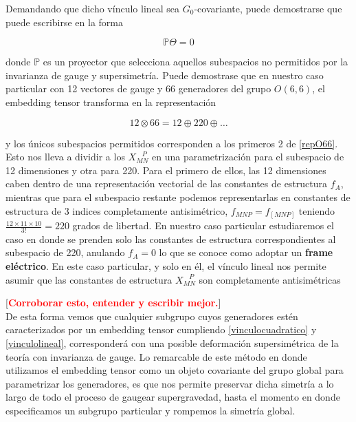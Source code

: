 \documentclass{article}
\numberwithin{equation}{section}
\begin{document}
Demandando que dicho vínculo lineal sea $G_0$-covariante, puede demostrarse que puede escribirse en la forma

\begin{equation}\label{vinculolineal}
\mathbb{P} \Theta = 0
\end{equation} 

donde $ \mathbb{P} $ es un proyector que selecciona aquellos subespacios no permitidos por la invarianza de gauge y supersimetría. Puede demostrase que en nuestro caso particular con 12 vectores de gauge y 66 generadores del grupo $ O(6,6) $, el embedding tensor transforma en la representación

\begin{equation}\label{repO66}
 12 \otimes 66 = 12 \oplus 220 \oplus \dots
\end{equation}

y los únicos subespacios permitidos corresponden a los primeros 2 de \ref{repO66}. Esto nos lleva a dividir a los $ X_{M N}^{\ \ \ \ P} $ en una parametrización para el subespacio de 12 dimensiones y otra para 220. Para el primero de ellos, las 12 dimensiones caben dentro de una representación vectorial de las constantes de estructura $ f_{A} $, mientras que para el subespacio restante podemos representarlas en constantes de estructura de 3 indices completamente antisimétrico, $ f_{M N P} = f_{\left[M N P\right]} $ teniendo $ \frac{12 \times 11 \times 10}{3!} = 220 $ grados de libertad. En nuestro caso particular estudiaremos el caso en donde se prenden solo las constantes de estructura correspondientes al subespacio de 220, anulando $ f_{A}=0 $ lo que se conoce como adoptar un \textbf{frame eléctrico}. En este caso particular, y solo en él, el vínculo lineal nos permite asumir que las constantes de estructura $ X_{M N}^{\ \ \ \ P} $ son completamente antisimétricas

[\textcolor{red}{\textbf{Corroborar esto, entender y escribir mejor.}}]\\

De esta forma vemos que cualquier subgrupo cuyos generadores estén caracterizados por un embedding tensor cumpliendo \ref{vinculocuadratico} y \ref{vinculolineal}, corresponderá con una posible deformación supersimétrica de la teoría con invarianza de gauge. Lo remarcable de este método en donde utilizamos el embedding tensor como un objeto covariante del grupo global para parametrizar los generadores, es que nos permite preservar dicha simetría a lo largo de todo el proceso de gaugear supergravedad, hasta el momento en donde especificamos un subgrupo particular y rompemos la simetría global.\\
\end{document}
